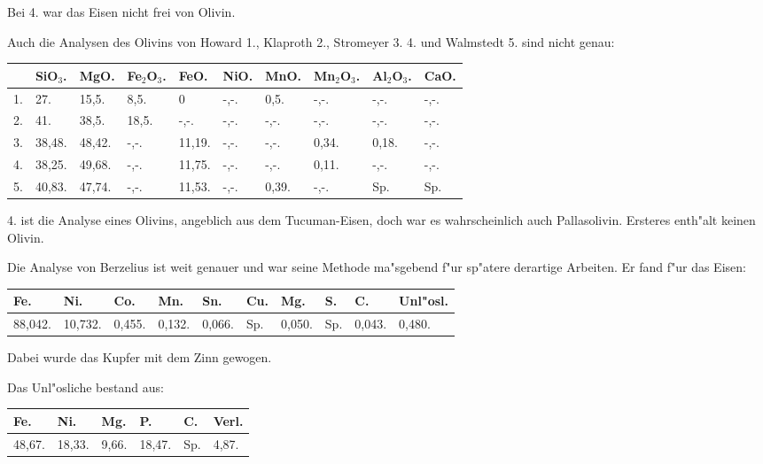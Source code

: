 \documentclass[a4paper, 11pt, oneside]{article}
\begin{document}
Bei 4. war das Eisen nicht frei von Olivin.

Auch die Analysen des Olivins von Howard 1., Klaproth 2., Stromeyer 3. 4. und Walmstedt 5. sind nicht genau:
\begin{table}[H]
    \centering
    \footnotesize
    \begin{tabular}{l l l l l l l l l l}
         & SiO$_{3}$. & MgO. & Fe$_{2}$O$_{3}$. & FeO. & NiO. & MnO. & Mn$_{2}$O$_{3}$. & Al$_{2}$O$_{3}$. & CaO. \\ \hline
        1. & 27. & 15,5. & 8,5. & 0 & -,-. & 0,5. & -,-. & -,-. & -,-. \\
        2. & 41. & 38,5. & 18,5. & -,-. & -,-. & -,-. & -,-. & -,-. & -,-. \\
        3. & 38,48. & 48,42. & -,-. & 11,19. & -,-. & -,-. & 0,34. & 0,18. & -,-. \\
        4. & 38,25. & 49,68. & -,-. & 11,75. & -,-. & -,-. & 0,11. & -,-. & -,-. \\
        5. & 40,83. & 47,74. & -,-. & 11,53. & -,-. & 0,39. & -,-. & Sp. & Sp. \\
    \end{tabular}
\end{table}

4. ist die Analyse eines Olivins, angeblich aus dem Tucuman-Eisen, doch war es wahrscheinlich auch Pallasolivin. Ersteres enth"alt keinen Olivin.

Die Analyse von Berzelius ist weit genauer und war seine Methode ma"sgebend f"ur sp"atere derartige Arbeiten. Er fand f"ur das Eisen:
\begin{table}[H]
    \centering
    \footnotesize
    \begin{tabular}{l l l l l l l l l l}
        Fe. & Ni. & Co. & Mn. & Sn. & Cu. & Mg. & S. & C. & Unl"osl. \\ \hline
        88,042. & 10,732. & 0,455. & 0,132. & 0,066. & Sp. & 0,050. & Sp. & 0,043. & 0,480. \\
    \end{tabular}
\end{table}

Dabei wurde das Kupfer mit dem Zinn gewogen.

Das Unl"osliche bestand aus:
\begin{table}[H]
    \centering
    \begin{tabular}{l l l l l l}
        Fe. & Ni. & Mg. & P. & C. & Verl. \\ \hline
        48,67. & 18,33. & 9,66. & 18,47. & Sp. & 4,87. \\
    \end{tabular}
\end{table}
\end{document}
